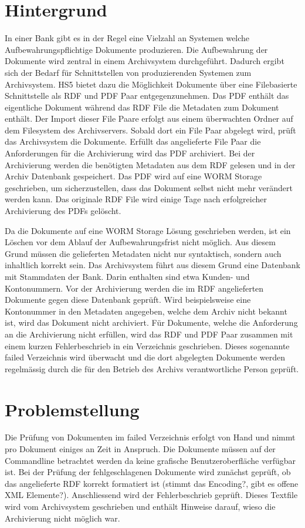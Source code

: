 \documentclass[a4paper,oneside, 12pt]{report}
\begin{document}
\section{Hintergrund}
In einer Bank gibt es in der Regel eine Vielzahl an Systemen welche Aufbewahrungspflichtige Dokumente produzieren. Die Aufbewahrung der Dokumente wird zentral in einem Archivsystem durchgeführt. Dadurch ergibt sich der Bedarf für Schnittstellen von produzierenden Systemen zum Archivsystem. \ac{HS5} bietet dazu die Möglichkeit Dokumente über eine Filebasierte Schnittstelle als \ac{RDF} und PDF Paar entgegenzunehmen. Das PDF enthält das eigentliche Dokument während das \ac{RDF} File die Metadaten zum Dokument enthält. Der Import dieser File Paare erfolgt aus einem überwachten Ordner auf dem Filesystem des Archivservers. Sobald dort ein File Paar abgelegt wird, prüft das Archivsystem die Dokumente. Erfüllt das angelieferte File Paar die Anforderungen für die Archivierung wird das PDF archiviert. Bei der Archivierung werden die benötigten Metadaten aus dem \ac{RDF} gelesen und in der Archiv Datenbank gespeichert. Das PDF wird auf eine \ac{WORM} Storage geschrieben, um sicherzustellen, dass das Dokument selbst nicht mehr verändert werden kann. Das originale \ac{RDF} File wird einige Tage nach erfolgreicher Archivierung des PDFs gelöscht.

Da die Dokumente auf eine \ac{WORM} Storage Lösung geschrieben werden, ist ein Löschen vor dem Ablauf der Aufbewahrungsfrist nicht möglich. Aus diesem Grund müssen die gelieferten Metadaten nicht nur syntaktisch, sondern auch inhaltlich korrekt sein. Das Archivsystem führt aus diesem Grund eine Datenbank mit Stammdaten der Bank. Darin enthalten sind etwa Kunden- und Kontonummern. Vor der Archivierung werden die im \ac{RDF} angelieferten Dokumente gegen diese Datenbank geprüft. Wird beispielsweise eine Kontonummer in den Metadaten angegeben, welche dem Archiv nicht bekannt ist, wird das Dokument nicht archiviert. Für Dokumente, welche die Anforderung an die Archivierung nicht erfüllen, wird das RDF und PDF Paar zusammen mit einem kurzen Fehlerbeschrieb in ein Verzeichnis geschrieben. Dieses sogenannte failed Verzeichnis wird überwacht und die dort abgelegten Dokumente werden regelmässig durch die für den Betrieb des Archivs verantwortliche Person geprüft.

\section{Problemstellung}
Die Prüfung von Dokumenten im failed Verzeichnis erfolgt von Hand und nimmt pro Dokument einiges an Zeit in Anspruch. Die Dokumente müssen auf der Commandline betrachtet werden da keine grafische Benutzeroberfläche verfügbar ist. Bei der Prüfung der fehlgeschlagenen Dokumente wird zunächst geprüft, ob das angelieferte RDF korrekt formatiert ist (stimmt das Encoding?, gibt es offene XML Elemente?). Anschliessend wird der Fehlerbeschrieb geprüft. Dieses Textfile wird vom Archivsystem geschrieben und enthält Hinweise darauf, wieso die Archivierung nicht möglich war.
\end{document}
